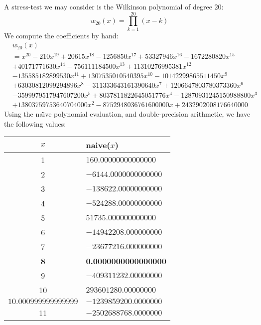 \begin{ex}
  A stress-test we may consider is the Wilkinson polynomial of degree
  20:
  \begin{equation}
    w_{20}(x) = \prod^{20}_{k=1}(x-k)
  \end{equation}
  We compute the coefficients by hand:
  \begin{equation}
    \begin{split}
      &w_{20}(x)\\
      &= x^{20}-210 x^{19}+20615 x^{18}-1256850 x^{17}+53327946 x^{16}-1672280820x^{15}\\
    &+40171771630 x^{14}-756111184500 x^{13}+11310276995381 x^{12}\\
      & -135585182899530 x^{11}+1307535010540395 x^{10}-10142299865511450 x^9\\
      &+63030812099294896 x^8-311333643161390640 x^7+1206647803780373360 x^6\\
      &-3599979517947607200 x^5+8037811822645051776 x^4-12870931245150988800 x^3\\
      & +13803759753640704000 x^2-8752948036761600000 x+2432902008176640000
    \end{split}
  \end{equation}
  Using the na\"{\i}ve polynomial evaluation, and double-precision
  arithmetic, we have the following values:
  \begin{center}
    \begin{tabular}{c|l}
      $x$ & naive($x$)\\ \hline
      1 &   $160.00000000000000$      \\
      2 &  $-6144.0000000000000$      \\
      3 &  $-138622.00000000000$      \\
      4 &  $-524288.00000000000$      \\
      5 &   $51735.000000000000$      \\
      6 &  $-14942208.000000000$      \\
      7 &  $-23677216.000000000$      \\
      \textbf{8} & \textbf{0.0000000000000000}      \\
      9 &  $-409311232.00000000$      \\
      10 &   $293601280.00000000$      \\
      $10.000999999999999$      &  $-1239859200.0000000$      \\
      11 &  $-2502688768.0000000$      \\

\end{tabular}
\end{center}
\end{ex}
